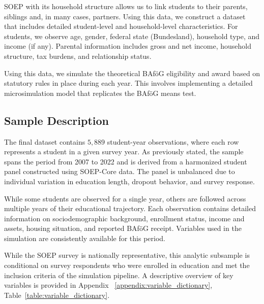 SOEP with its household structure allows us to link students to their parents, siblings and, in many cases, partners.
Using this data, we construct a dataset that includes detailed student-level and household-level characteristics. 
For students, we observe age, gender, federal state (Bundesland), household type, and income (if any). 
Parental information includes gross and net income, household structure, tax burdens, and relationship status. 

Using this data, we simulate the theoretical BAföG eligibility and award based on statutory rules in place during each year. 
This involves implementing a detailed microsimulation model that replicates the BAföG means test.

\subsection{Sample Description}
The final dataset contains \( 5,889 \) student-year observations, where each row represents a student in a given survey year. As previously stated, the sample spans the period from 2007 to 2022 and is derived from a harmonized student panel constructed using SOEP-Core data. The panel is unbalanced due to individual variation in education length, dropout behavior, and survey response. 

While some students are observed for a single year, others are followed across multiple years of their educational trajectory. Each observation contains detailed information on sociodemographic background, enrollment status, income and assets, housing situation, and reported BAföG receipt. Variables used in the simulation are consistently available for this period.


While the SOEP survey is nationally representative, this analytic subsample is conditional on survey respondents who were enrolled in education and met the inclusion criteria of the simulation pipeline. 
A descriptive overview of key variables is provided in Appendix ~\ref{appendix:variable_dictionary}, Table~\ref{table:variable_dictionary}.



